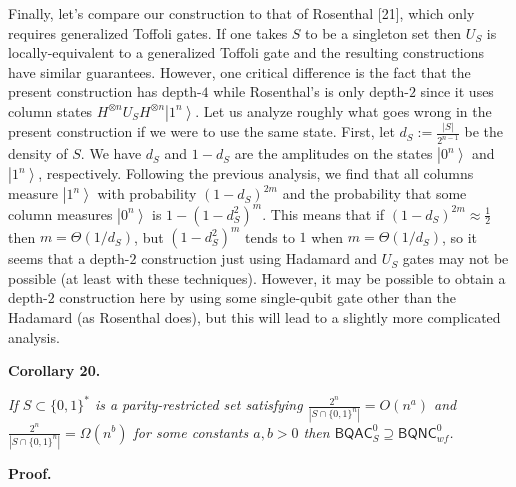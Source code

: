 \documentclass[10pt,a4paper]{article}
\begin{document}
Finally, let’s compare our construction to that of Rosenthal [21], which only requires generalized Toffoli gates. If one takes $S$ to be a singleton set then $U_{S}$ is locally-equivalent to a generalized Toffoli gate and the resulting constructions have similar guarantees. However, one critical difference is the fact that the present construction has depth-$4$ while Rosenthal’s is only depth-$2$ since it uses column states $H^{\otimes n}U_{S}H^{\otimes n}\left|1^{n}\right\rangle$. Let us analyze roughly what goes wrong in the present construction if we were to use the same state. First, let $d_{S}:=\frac{|S|}{2^{n-1}}$ be the density of $S$. We have $d_{S}$ and $1-d_{S}$ are the amplitudes on the states $\left|0^{n}\right\rangle$ and $\left|1^{n}\right\rangle$, respectively. Following the previous analysis, we find that all columns measure $\left|1^{n}\right\rangle$ with probability $(1-d_{S})^{2m}$ and the probability that some column measures $\left|0^{n}\right\rangle$ is $1-(1-d_{S}^{2})^{m}$. This means that if $(1-d_{S})^{2m}\approx\frac{1}{2}$ then $m=\Theta(1/d_{S})$, but $(1-d_{S}^{2})^{m}$ tends to $1$ when $m=\Theta(1/d_{S})$, so it seems that a depth-$2$ construction just using Hadamard and $U_{S}$ gates may not be possible (at least with these techniques). However, it may be possible to obtain a depth-$2$ construction here by using some single-qubit gate other than the Hadamard (as Rosenthal does), but this will lead to a slightly more complicated analysis.\par





\par\medskip\noindent\textbf{
\textbf{Corollary 20}\textbf{.}
}\par



\emph{If $S\subset\{0,1\}^{*}$ is a parity-restricted set satisfying $\frac{2^{n}}{|S\cap\{0,1\}^{n}|}=O(n^{a})$ and $\frac{2^{n}}{|S\cap\{0,1\}^{n}|}=\Omega(n^{b})$ for some constants $a,b>0$ then ${\mathsf{BQAC}}^{0}_{S}\supseteq{\mathsf{BQNC}}^{0}_{wf}$.}\par







\par\medskip\noindent\textbf{Proof.}\par
\end{document}
